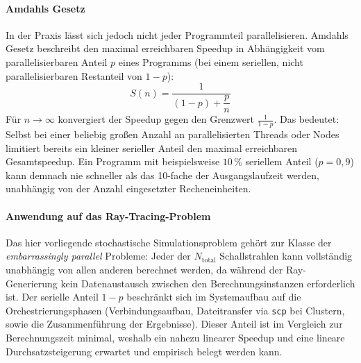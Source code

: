 \paragraph{Amdahls Gesetz}
In der Praxis lässt sich jedoch nicht jeder Programmteil parallelisieren. Amdahls Gesetz \parencite{amdahl1967} beschreibt den maximal erreichbaren Speedup in Abhängigkeit vom parallelisierbaren Anteil $p$ eines Programms (bei einem seriellen, nicht parallelisierbaren Restanteil von $1-p$):
\begin{equation}
    S(n) = \frac{1}{(1-p) + \dfrac{p}{n}}
    \label{eq:amdahl}
\end{equation}
Für $n \to \infty$ konvergiert der Speedup gegen den Grenzwert $\frac{1}{1-p}$. Das bedeutet: Selbst bei einer beliebig großen Anzahl an parallelisierten Threads oder Nodes limitiert bereits ein kleiner serieller Anteil den maximal erreichbaren Gesamtspeedup. Ein Programm mit beispielsweise $10\,\%$ seriellem Anteil ($p = 0{,}9$) kann demnach nie schneller als das 10-fache der Ausgangslaufzeit werden, unabhängig von der Anzahl eingesetzter Recheneinheiten.

\paragraph{Anwendung auf das Ray-Tracing-Problem}
Das hier vorliegende stochastische Simulationsproblem gehört zur Klasse der \emph{embarrassingly parallel} Probleme: Jeder der $N_{\text{total}}$ Schallstrahlen kann vollständig unabhängig von allen anderen berechnet werden, da während der Ray-Generierung kein Datenaustausch zwischen den Berechnungsinstanzen erforderlich ist. Der serielle Anteil $1-p$ beschränkt sich im Systemaufbau auf die Orchestrierungsphasen (Verbindungsaufbau, Dateitransfer via \texttt{scp} bei Clustern, sowie die Zusammenführung der Ergebnisse). Dieser Anteil ist im Vergleich zur Berechnungszeit minimal, weshalb ein nahezu linearer Speedup und eine lineare Durchsatzsteigerung erwartet und empirisch belegt werden kann.